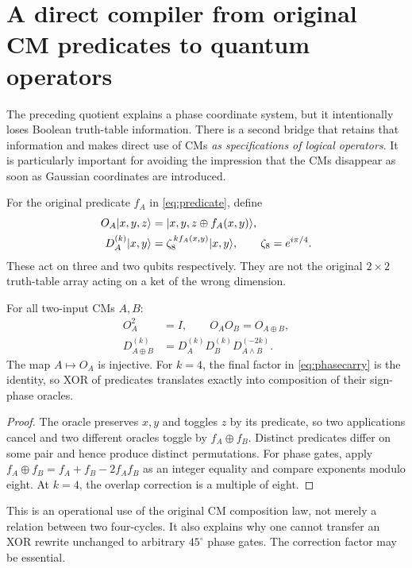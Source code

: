 \section{A direct compiler from original CM predicates to quantum operators}\label{sec:compiler}
The preceding quotient explains a phase coordinate system, but it intentionally loses Boolean truth-table information. There is a second bridge that retains that information and makes direct use of CMs \emph{as specifications of logical operators}. It is particularly important for avoiding the impression that the CMs disappear as soon as Gaussian coordinates are introduced.

\begin{definition}
For the original predicate $f_A$ in \cref{eq:predicate}, define
\begin{align}
 O_A\lvert x,y,z\rangle&=\lvert x,y,z\oplus f_A(x,y)\rangle,\label{eq:oracle}\\
 D_A^{(k)}\lvert x,y\rangle&=\zeta_8^{\,k f_A(x,y)}\lvert x,y\rangle,
 \qquad\zeta_8=e^{i\pi/4}.\label{eq:phaseoracle}
\end{align}
These act on three and two qubits respectively. They are not the original $2\times2$ truth-table array acting on a ket of the wrong dimension.
\end{definition}

\begin{theorem}\label{thm:compiler}
For all two-input CMs $A,B$:
\begin{align}
 O_A^2&=I,\qquad O_AO_B=O_{A\oplus B},\label{eq:oraclehom}\\
 D_{A\oplus B}^{(k)}
 &=D_A^{(k)}D_B^{(k)}D_{A\land B}^{(-2k)}.\label{eq:phasecarry}
\end{align}
The map $A\mapsto O_A$ is injective. For $k=4$, the final factor in \cref{eq:phasecarry} is the identity, so XOR of predicates translates exactly into composition of their sign-phase oracles.
\end{theorem}
\begin{proof}
The oracle preserves $x,y$ and toggles $z$ by its predicate, so two applications cancel and two different oracles toggle by $f_A\oplus f_B$. Distinct predicates differ on some pair and hence produce distinct permutations. For phase gates, apply $f_A\oplus f_B=f_A+f_B-2f_Af_B$ as an integer equality and compare exponents modulo eight. At $k=4$, the overlap correction is a multiple of eight.
\end{proof}
This is an operational use of the original CM composition law, not merely a relation between two four-cycles. It also explains why one cannot transfer an XOR rewrite unchanged to arbitrary $45^\circ$ phase gates. The correction factor may be essential.

